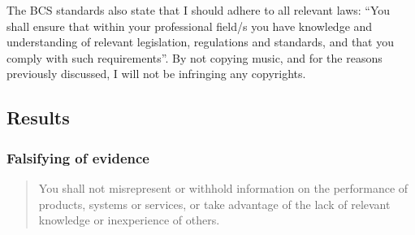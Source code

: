 The BCS standards also state that I should adhere to all relevant laws:
``You shall ensure that within your professional field/s you have
knowledge and understanding of relevant legislation, regulations and
standards, and that you comply with such requirements''.
By not copying music, and for the reasons previously discussed, I will not be
infringing any copyrights.
\subsection{Results}
\subsubsection{Falsifying of evidence}
\begin{quotation}
You shall not misrepresent or withhold information on the performance of products, systems or services, or take advantage of the lack of relevant knowledge or inexperience of others.
\end{quotation}

